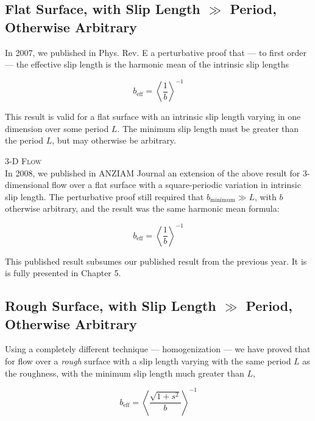 \documentclass[a4paper]{report}
\newcommand{\beff}{\ensuremath{b_{\mathrm{eff}}}}
\begin{document}
\subsection*{Flat Surface, with Slip Length $\gg$ Period, Otherwise Arbitrary}


In 2007, we published in Phys. Rev. E \cite{HendyLund2007} a perturbative proof that --- to first order --- the effective slip length is the harmonic mean of the intrinsic slip lengths

\begin{equation*}
\beff = \left< \frac{1}{b} \right>^{-1}
\end{equation*}

This result is valid for a flat surface with an intrinsic slip length varying in one dimension over some period $L$.  The minimum slip length must be greater than the period $L$, but may otherwise be arbitrary.

\vspace{1em}
\colorbox[gray]{0.8}{ \textsc{3-D Flow} }
\vspace{0.5em} \\
In 2008, we published in ANZIAM Journal \cite{LundHendy2008} an extension of the above result for 3-dimensional flow over a flat surface with a square-periodic variation in intrinsic slip length.  The perturbative proof still required that $b_{\mathrm{minimum}} \gg L$, with $b$ otherwise arbitrary, and the result was the same harmonic mean formula:

\begin{equation*}
\beff = \left< \frac{1}{b} \right>^{-1}
\end{equation*}

This published result subsumes our published result from the previous year.  It is is fully presented in Chapter 5.

\subsection*{Rough Surface, with Slip Length $\gg$ Period, Otherwise Arbitrary}

Using a completely different technique --- homogenization --- we have proved that
for flow over a \emph{rough} surface with a slip length varying with the same period $L$ as the roughness, with the minimum slip length much greater than $L$,

\begin{equation*}
\beff = \left< \frac{\sqrt{1 + s^2}}{b} \right>^{-1}
\end{equation*}
\end{document}
